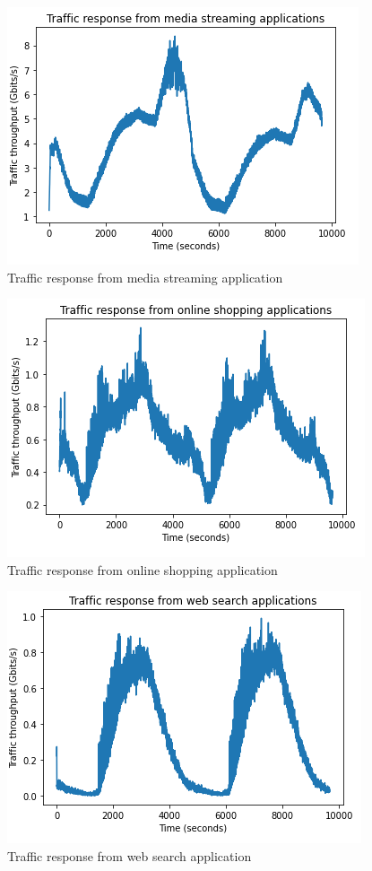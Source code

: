 \documentclass[conference]{IEEEtran}
\begin{document}
\begin{figure}[]
    \centering
        \includegraphics[scale = 0.8]{imgs/media_streaming_response_24_02.png}
        \caption{Traffic response from media streaming application}
        \label{fig:media_resp}
    \end{figure}

\begin{figure}[]
    \centering
        \includegraphics[scale = 0.8]{imgs/online_shopping_response.png}
        \caption{Traffic response from online shopping application}
        \label{fig:shopping_resp}
    \end{figure}

\begin{figure}[]
    \centering
        \includegraphics[scale = 0.8]{imgs/search_server_response.png}
        \caption{Traffic response from web search application}
        \label{fig:search_resp}
    \end{figure}
\end{document}

